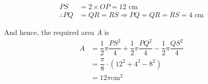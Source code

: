 \begin{solution}[\halfpage]
	\begin{align}
		PS &= 2\times OP = \text{12 cm} \\
		\therefore PQ &= QR = RS \Rightarrow PQ = QR = RS = \text{4 cm}
	\end{align}
	
	And hence, the required area $A$ is
	\begin{align}
		A &= \dfrac{1}{2}\pi\dfrac{PS^2}{4} + \dfrac{1}{2}\pi\dfrac{PQ^2}{4} 
		- \dfrac{1}{2}\pi\dfrac{QS^2}{4} \\
		&= \dfrac{\pi}{8}\cdot\left( 12^2 + 4^2 - 8^2\right) \\
		&= 12\pi \text{cm}^2
	\end{align}
\end{solution}
